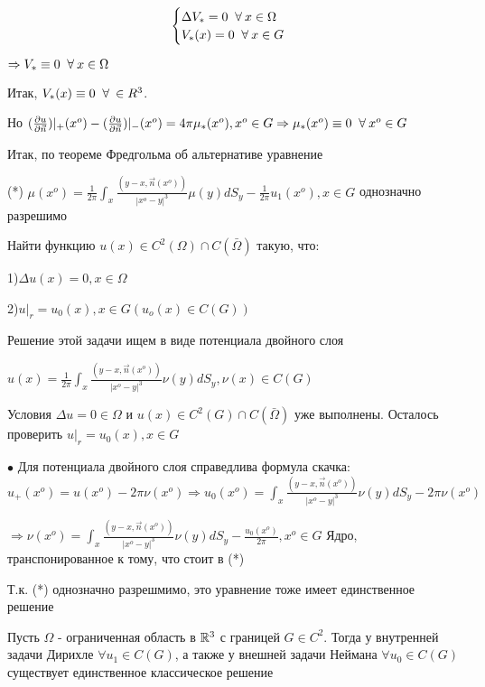 \begin{equation}
 \begin{cases}
 \Delta V_* = 0 \;\;\forall\: x \in \Omega
  \\
  V_*(x) = 0 \;\;\forall\: x \in G
 \end{cases}
\end{equation}

$\Rightarrow V_* \equiv 0 \;\;\forall\: x \in \Omega$

Итак, $V_*(x) \equiv 0 \;\;\forall\: \in R^3$. 

Но $(\frac{\partial u}{\partial \vec{n}})|_+(x^o) - (\frac{\partial u}{\partial \vec{n}})|_-(x^o) = 4\pi \mu_*(x^o), x^o \in G \Rightarrow \mu_*(x^o) \equiv 0 \;\;\forall\: x^o \in G$

Итак, по теореме Фредгольма об альтернативе уравнение 

(*) $\mu(x^o) = \frac{1}{2\pi}\int_x \frac{(y - x, \vec{n}(x^o))}{|x^o - y|^3}\mu(y)dS_y - \frac{1}{2\pi}u_1(x^o), x \in G$ однозначно разрешимо


Найти функцию $u(x) \in C^2(\Omega) \cap C(\bar{\Omega})$ такую, что:

1)$\Delta u(x) = 0, x \in \Omega$

2)$u|_r = u_0(x), x \in G (u_o(x) \in C(G))$ 

Решение этой задачи ищем в виде потенциала двойного слоя 

$u(x) = \frac{1}{2\pi}\int_x \frac{(y - x, \vec{n}(x^o))}{|x^o - y|^3}\nu(y)dS_y, \nu(x) \in C(G)$

Условия $\Delta u = 0 \in \Omega$ и $u(x) \in C^2(G) \cap C(\bar{\Omega})$ уже выполнены. Осталось проверить $u|_r = u_0(x), x \in G$

$\bullet$ Для потенциала двойного слоя справедлива формула скачка: $u_+(x^o) = u(x^o) - 2\pi\nu(x^o) \Rightarrow u_0(x^o) = \int_x \frac{(y - x, \vec{n}(x^o))}{|x^o - y|^3}\nu(y)dS_y - 2\pi\nu(x^o)$

$\Rightarrow \nu(x^o) = \int_x \frac{(y - x, \vec{n}(x^o))}{|x^o - y|^3}\nu(y)dS_y - \frac{u_0(x^o)}{2\pi}, x^o \in G$ Ядро, транспонированное к тому, что стоит в (*) 

Т.к. (*) однозначно разрешмимо, это уравнение тоже имеет единственное решение

\begin{theorem} Пусть $\Omega$ - ограниченная область в $\mathbb{R}^3$ с границей $G \in C^2$. Тогда у внутренней задачи Дирихле $\forall u_1 \in C(G)$, а также у внешней задачи Неймана $\forall u_0 \in C(G)$ существует единственное классическое решение
\end{theorem} 



